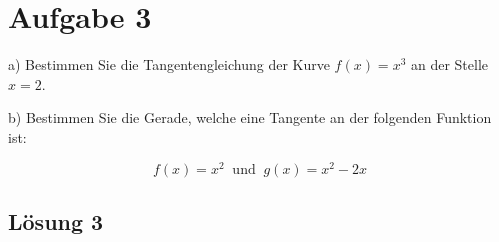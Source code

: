\documentclass[main.tex]{subfiles}
\begin{document}
\section{Aufgabe 3}
a) Bestimmen Sie die Tangentengleichung der Kurve $f(x) = x^3$ an der Stelle $x=2$.

b) Bestimmen Sie die Gerade, welche eine Tangente an der folgenden Funktion ist:

\begin{equation*}
    f(x) = x^2 \ \text{ und }\ g(x) = x^2-2x
\end{equation*}

\subsection{Lösung 3}
\end{document}
